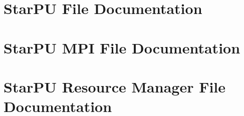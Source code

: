 \chapter{StarPU File Documentation}
















































































\chapter{StarPU MPI File Documentation}
























\chapter{StarPU Resource Manager File Documentation}



